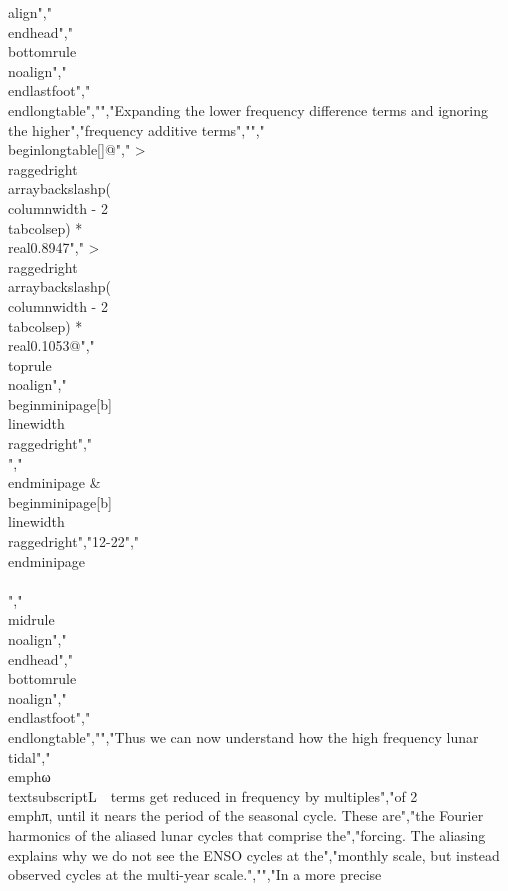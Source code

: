 {{{{{{{{{{align{}","\\endhead","\\bottomrule\\noalign{}","\\endlastfoot","\\end{longtable}","","Expanding the lower frequency difference terms and ignoring the higher","frequency additive terms","","\\begin{longtable}[]{@{}","  >{\\raggedright\\arraybackslash}p{(\\columnwidth - 2\\tabcolsep) * \\real{0.8947}}","  >{\\raggedright\\arraybackslash}p{(\\columnwidth - 2\\tabcolsep) * \\real{0.1053}}@{}}","\\toprule\\noalign{}","\\begin{minipage}[b]{\\linewidth}\\raggedright","\\[f(t) = k/2\\sum_{i = 1}^{n}{a_{i}\\sin\\left( \\left( \\omega_{L} - 2\\pi i \\right)t + \\psi_{i} \\right)\\  + \\ ...}\\]","\\end{minipage} & \\begin{minipage}[b]{\\linewidth}\\raggedright","12-22","\\end{minipage} \\\\","\\midrule\\noalign{}","\\endhead","\\bottomrule\\noalign{}","\\endlastfoot","\\end{longtable}","","Thus we can now understand how the high frequency lunar tidal","\\emph{ω\\textsubscript{L}}~~terms get reduced in frequency by multiples","of 2\\emph{π}, until it nears the period of the seasonal cycle. These are","the Fourier harmonics of the aliased lunar cycles that comprise the","forcing. The aliasing explains why we do not see the ENSO cycles at the","monthly scale, but instead observed cycles at the multi-year scale.","","In a more precise }}}}}}}}}}
